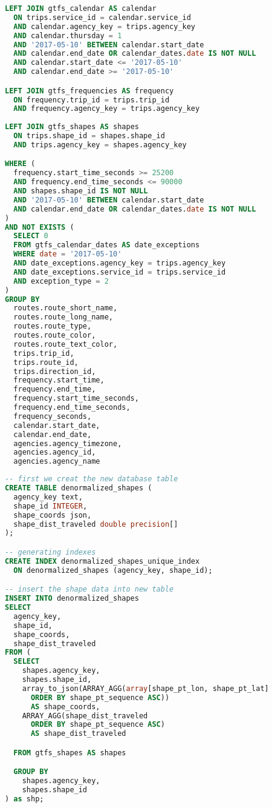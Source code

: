 \begin{newpage}
\begin{lstlisting}[captionpos=t, caption=Postgresql Datenbankabfrage von allen aktiven Trips mit ihrem dazugehörigen Linienverlauf, label=lst:get_active_trips_query, language=SQL]
LEFT JOIN gtfs_calendar AS calendar 
  ON trips.service_id = calendar.service_id
  AND calendar.agency_key = trips.agency_key
  AND calendar.thursday = 1
  AND '2017-05-10' BETWEEN calendar.start_date 
  AND calendar.end_date OR calendar_dates.date IS NOT NULL
  AND calendar.start_date <= '2017-05-10'
  AND calendar.end_date >= '2017-05-10'

LEFT JOIN gtfs_frequencies AS frequency
  ON frequency.trip_id = trips.trip_id
  AND frequency.agency_key = trips.agency_key
    
LEFT JOIN gtfs_shapes AS shapes
  ON trips.shape_id = shapes.shape_id
  AND trips.agency_key = shapes.agency_key

WHERE (
  frequency.start_time_seconds >= 25200 
  AND frequency.end_time_seconds <= 90000
  AND shapes.shape_id IS NOT NULL
  AND '2017-05-10' BETWEEN calendar.start_date 
  AND calendar.end_date OR calendar_dates.date IS NOT NULL
) 
AND NOT EXISTS (
  SELECT 0
  FROM gtfs_calendar_dates AS date_exceptions
  WHERE date = '2017-05-10'
  AND date_exceptions.agency_key = trips.agency_key
  AND date_exceptions.service_id = trips.service_id
  AND exception_type = 2
)
GROUP BY 
  routes.route_short_name,
  routes.route_long_name,
  routes.route_type,
  routes.route_color,
  routes.route_text_color,
  trips.trip_id, 
  trips.route_id,
  trips.direction_id,
  frequency.start_time, 
  frequency.end_time, 
  frequency.start_time_seconds,
  frequency.end_time_seconds,
  frequency_seconds,
  calendar.start_date,
  calendar.end_date,
  agencies.agency_timezone,
  agencies.agency_id,
  agencies.agency_name
\end{lstlisting}


\begin{lstlisting}[captionpos=t, caption=Erstellen einer denormalized\_shapes Tabelle, label=lst:sql_aggregate_shape, language=SQL]
-- first we creat the new database table
CREATE TABLE denormalized_shapes (
  agency_key text,
  shape_id INTEGER,
  shape_coords json,
  shape_dist_traveled double precision[]
);

-- generating indexes
CREATE INDEX denormalized_shapes_unique_index 
  ON denormalized_shapes (agency_key, shape_id);

-- insert the shape data into new table
INSERT INTO denormalized_shapes
SELECT
  agency_key,
  shape_id,
  shape_coords,
  shape_dist_traveled
FROM (
  SELECT
    shapes.agency_key,
    shapes.shape_id,
    array_to_json(ARRAY_AGG(array[shape_pt_lon, shape_pt_lat]
      ORDER BY shape_pt_sequence ASC))
      AS shape_coords,
    ARRAY_AGG(shape_dist_traveled
      ORDER BY shape_pt_sequence ASC)
      AS shape_dist_traveled

  FROM gtfs_shapes AS shapes

  GROUP BY
    shapes.agency_key,
    shapes.shape_id
) as shp;
\end{lstlisting}
  
      
\end{newpage}
